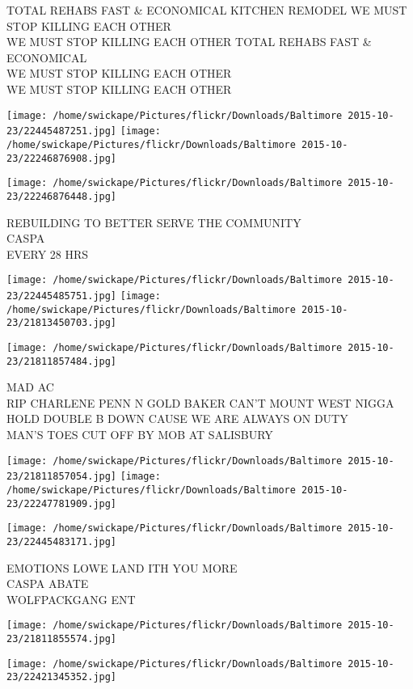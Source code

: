 \documentclass[10pt,letterpaper]{article}
\begin{document}
TOTAL REHABS FAST \& ECONOMICAL KITCHEN REMODEL WE MUST STOP KILLING EACH OTHER\\
WE MUST STOP KILLING EACH OTHER TOTAL REHABS FAST \& ECONOMICAL\\
WE MUST STOP KILLING EACH OTHER\\
WE MUST STOP KILLING EACH OTHER
\pagebreak

\texttt{[image: /home/swickape/Pictures/flickr/Downloads/Baltimore 2015-10-23/22445487251.jpg]}
\texttt{[image: /home/swickape/Pictures/flickr/Downloads/Baltimore 2015-10-23/22246876908.jpg]}

\vspace{0.25in}
\texttt{[image: /home/swickape/Pictures/flickr/Downloads/Baltimore 2015-10-23/22246876448.jpg]}

REBUILDING TO BETTER SERVE THE COMMUNITY\\
CASPA\\
EVERY 28 HRS
\pagebreak

\texttt{[image: /home/swickape/Pictures/flickr/Downloads/Baltimore 2015-10-23/22445485751.jpg]}
\texttt{[image: /home/swickape/Pictures/flickr/Downloads/Baltimore 2015-10-23/21813450703.jpg]}

\vspace{0.25in}
\texttt{[image: /home/swickape/Pictures/flickr/Downloads/Baltimore 2015-10-23/21811857484.jpg]}

MAD AC\\
RIP CHARLENE PENN N GOLD BAKER CAN'T MOUNT WEST NIGGA HOLD DOUBLE B DOWN CAUSE WE ARE ALWAYS ON DUTY\\
MAN'S TOES CUT OFF BY MOB AT SALISBURY
\pagebreak

\texttt{[image: /home/swickape/Pictures/flickr/Downloads/Baltimore 2015-10-23/21811857054.jpg]}
\texttt{[image: /home/swickape/Pictures/flickr/Downloads/Baltimore 2015-10-23/22247781909.jpg]}

\texttt{[image: /home/swickape/Pictures/flickr/Downloads/Baltimore 2015-10-23/22445483171.jpg]}

EMOTIONS LOWE LAND ITH YOU MORE\\
CASPA ABATE\\
WOLFPACKGANG ENT
\pagebreak

\texttt{[image: /home/swickape/Pictures/flickr/Downloads/Baltimore 2015-10-23/21811855574.jpg]}

\vspace{0.25in}
\texttt{[image: /home/swickape/Pictures/flickr/Downloads/Baltimore 2015-10-23/22421345352.jpg]}
\end{document}
